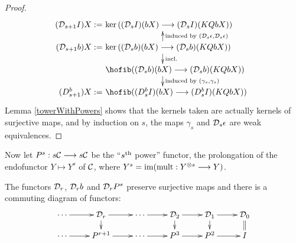 \documentclass[11pt]{amsart}
\theoremstyle{plain}
\newcommand{\caldup}[1]{\calD_{\smash{#1}}}
\begin{document}
\begin{proof}
\[\qquad \quad \xymatrix@R=4mm{
\makebox[0cm][r]{$(\caldup{s+1}I)X:=\,$}\makebox[5cm][l]{$\,\ker((\caldup{s}I)(bX)\to (\caldup{s}I)(KQbX))$}\\
\makebox[0cm][r]{$(\caldup{s+1}b)X:=\,$}\makebox[5cm][l]{$\,\ker((\caldup{s}b)(bX)\to (\caldup{s}b)(KQbX))$}\ar[d]^-{\textup{incl.}}_-{}%
\ar[u]_-{\textup{induced by }(\caldup{s}\epsilon,\caldup{s}\epsilon)}^-{}%
\\%
\makebox[5cm][l]{$\,\hofib((\caldup{s}b)(bX)\to(\caldup{s}b)(KQbX))$}\ar[d]^-{\textup{induced by }(\gamma_{s},\gamma_{s})}_-{}%
\\%
\makebox[0cm][r]{$(D_{\smash{s+1}}^{\smash{b}})X:=\,$}\makebox[5cm][l]{$\,\hofib((D_{\smash{s}}^{\smash{b}}I)(bX)\to (D_{\smash{s}}^{\smash{b}}I)(KQbX))$}%
}\]
\noindent Lemma \ref{towerWithPowers} shows that the kernels taken are actually kernels of surjective maps, and by induction on $s$, the maps $\gamma_s$ and $\caldup{s}\epsilon$ are weak equivalences.
%
\end{proof}
Now let $P^s:s\calC\to s\calC$ be the ``$s^\textup{th}$ power'' functor, the prolongation of the endofunctor $Y\mapsto Y^s$ of $\calC$, where $Y^s=\textup{im}(\textup{mult}:Y^{\otimes s}\to Y)$.
\begin{lem}\label{towerWithPowers}
The functors $\caldup{r}$, $\caldup{r}b$ and $\caldup{r}P^{s}$ preserve surjective maps and there is a commuting diagram of functors:
\[\xymatrix@R=4mm{
\cdots 
\ar[r]
&%
\caldup{r}
\ar[r]
\ar[d]
&%
\cdots \ar[r]
&%
\caldup{2}
\ar[r]
\ar[d]
&%
\caldup{1}
\ar[r]
\ar[d]&%
\caldup{0}
\ar@{=}[d]
\\%
\cdots
\ar[r]
&%
P^{r+1}
\ar[r]
&%
\cdots 
\ar[r]&%
P^3
\ar[r]
&P^2
\ar[r]
&%
I%
}\]
\end{lem}
\end{document}
